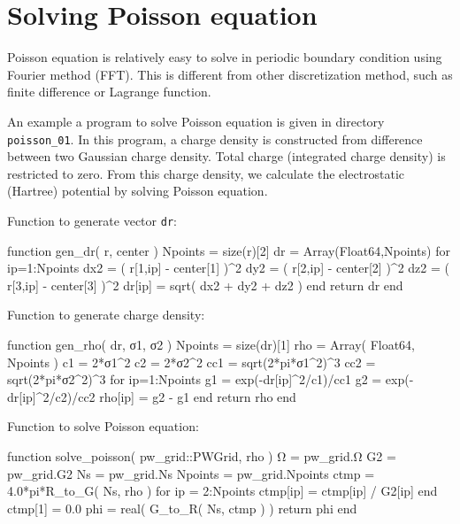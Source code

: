 \section{Solving Poisson equation}

Poisson equation is relatively easy to solve in periodic
boundary condition using Fourier method (FFT). This is different
from other discretization method, such as finite difference or Lagrange
function.

An example a program to solve Poisson equation is given in directory
{\tt poisson\_01}. In this program, a charge density is constructed
from difference between two Gaussian charge density. Total charge
(integrated charge density) is restricted to zero.
From this charge density, we calculate the electrostatic (Hartree) potential
by solving Poisson equation.

Function to generate vector \verb|dr|:
\begin{juliacode}
function gen_dr( r, center )
  Npoints = size(r)[2]
  dr = Array(Float64,Npoints)
  for ip=1:Npoints
    dx2 = ( r[1,ip] - center[1] )^2
    dy2 = ( r[2,ip] - center[2] )^2
    dz2 = ( r[3,ip] - center[3] )^2
    dr[ip] = sqrt( dx2 + dy2 + dz2 )
  end
  return dr
end
\end{juliacode}


Function to generate charge density:
\begin{juliacode}
function gen_rho( dr, σ1, σ2 )
  Npoints = size(dr)[1]
  rho = Array( Float64, Npoints )
  c1 = 2*σ1^2
  c2 = 2*σ2^2
  cc1 = sqrt(2*pi*σ1^2)^3
  cc2 = sqrt(2*pi*σ2^2)^3
  for ip=1:Npoints
    g1 = exp(-dr[ip]^2/c1)/cc1
    g2 = exp(-dr[ip]^2/c2)/cc2
    rho[ip] = g2 - g1
  end
  return rho
end
\end{juliacode}

Function to solve Poisson equation:
\begin{juliacode}
function solve_poisson( pw_grid::PWGrid, rho )
  Ω  = pw_grid.Ω
  G2 = pw_grid.G2
  Ns = pw_grid.Ns
  Npoints = pw_grid.Npoints
  ctmp = 4.0*pi*R_to_G( Ns, rho )
  for ip = 2:Npoints
    ctmp[ip] = ctmp[ip] / G2[ip]
  end
  ctmp[1] = 0.0
  phi = real( G_to_R( Ns, ctmp ) )
  return phi
end
\end{juliacode}
